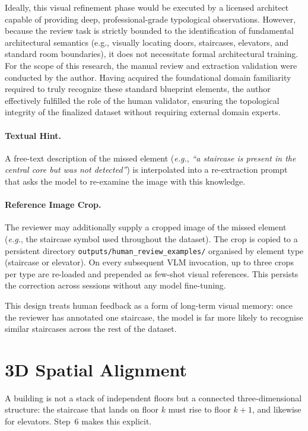 \documentclass[12pt,a4paper,openright]{report}
\newcommand{\eg}{\textit{e.g.}}
\newcommand{\code}[1]{\texttt{#1}}
\begin{document}
Ideally, this visual refinement phase would be executed by a licensed architect capable of providing deep, professional-grade typological observations. However, because the review task is strictly bounded to the identification of fundamental architectural semantics (e.g., visually locating doors, staircases, elevators, and standard room boundaries), it does not necessitate formal architectural training. For the scope of this research, the manual review and extraction validation were conducted by the author. Having acquired the foundational domain familiarity required to truly recognize these standard blueprint elements, the author effectively fulfilled the role of the human validator, ensuring the topological integrity of the finalized dataset without requiring external domain experts.

\paragraph{Textual Hint.} A free-text description of the missed element (\eg, \textit{``a staircase is present in the central core but was not detected''}) is interpolated into a re-extraction prompt that asks the model to re-examine the image with this knowledge.

\paragraph{Reference Image Crop.} The reviewer may additionally supply a cropped image of the missed element (\eg, the staircase symbol used throughout the dataset). The crop is copied to a persistent directory \code{outputs/human\_review\_examples/} organised by element type (staircase or elevator). On every subsequent VLM invocation, up to three crops per type are re-loaded and prepended as few-shot visual references. This persists the correction across sessions without any model fine-tuning.

This design treats human feedback as a form of long-term visual memory: once the reviewer has annotated one staircase, the model is far more likely to recognise similar staircases across the rest of the dataset.

\section{3D Spatial Alignment}
\label{sec:3d}

A building is not a stack of independent floors but a connected three-dimensional structure: the staircase that lands on floor $k$ must rise to floor $k+1$, and likewise for elevators. Step~6 makes this explicit.
\end{document}
